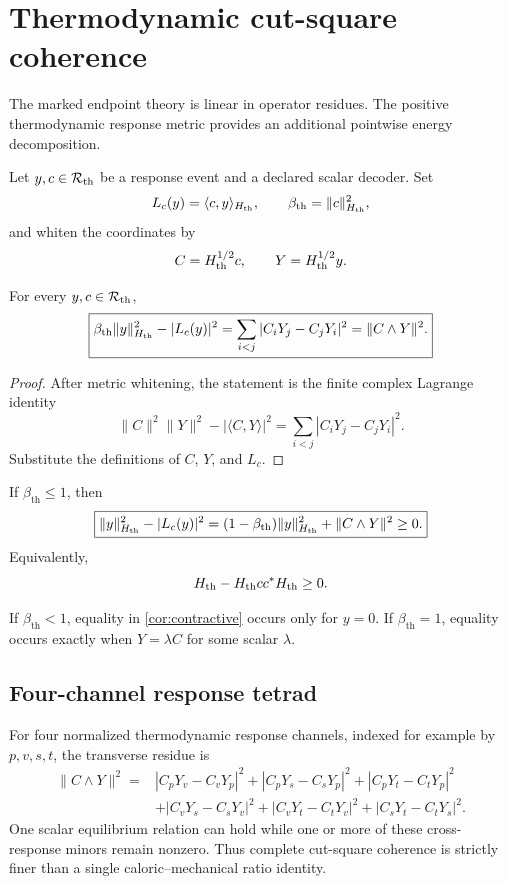 \section{Thermodynamic cut-square coherence}

The marked endpoint theory is linear in operator residues. The positive thermodynamic response metric provides an additional pointwise energy decomposition.

Let $y,c\in\mathcal R_{\mathrm{th}}$ be a response event and a declared scalar decoder. Set
\[
 L_c(y)=\langle c,y\rangle_{H_{\mathrm{th}}},
 \qquad
 \beta_{\mathrm{th}}=\|c\|_{H_{\mathrm{th}}}^2,
\]
and whiten the coordinates by
\[
 C=H_{\mathrm{th}}^{1/2}c,
 \qquad
 Y=H_{\mathrm{th}}^{1/2}y.
\]

\begin{theorem}\label{thm:cut-square}
For every $y,c\in\mathcal R_{\mathrm{th}}$,
\[
 \boxed{
 \beta_{\mathrm{th}}\|y\|_{H_{\mathrm{th}}}^2
 -|L_c(y)|^2
 =\sum_{i<j}|C_iY_j-C_jY_i|^2
 =\|C\wedge Y\|^2.}
\]
\end{theorem}

\begin{proof}
After metric whitening, the statement is the finite complex Lagrange identity
\[
 \|C\|^2\|Y\|^2-|\langle C,Y\rangle|^2
 =\sum_{i<j}|C_iY_j-C_jY_i|^2.
\]
Substitute the definitions of $C$, $Y$, and $L_c$.
\end{proof}

\begin{corollary}\label{cor:contractive}
If $\beta_{\mathrm{th}}\le1$, then
\[
 \boxed{
 \|y\|_{H_{\mathrm{th}}}^2-|L_c(y)|^2
 =(1-\beta_{\mathrm{th}})\|y\|_{H_{\mathrm{th}}}^2
 +\|C\wedge Y\|^2\ge0.}
\]
Equivalently,
\[
 H_{\mathrm{th}}-H_{\mathrm{th}} cc^*H_{\mathrm{th}}\ge0.
\]
\end{corollary}

\begin{corollary}
If $\beta_{\mathrm{th}}<1$, equality in \cref{cor:contractive} occurs only for $y=0$. If $\beta_{\mathrm{th}}=1$, equality occurs exactly when $Y=\lambda C$ for some scalar $\lambda$.
\end{corollary}

\subsection{Four-channel response tetrad}

For four normalized thermodynamic response channels, indexed for example by $p,v,s,t$, the transverse residue is
\[
\begin{aligned}
\|C\wedge Y\|^2={}&
|C_pY_v-C_vY_p|^2
+|C_pY_s-C_sY_p|^2
+|C_pY_t-C_tY_p|^2\\
&+|C_vY_s-C_sY_v|^2
+|C_vY_t-C_tY_v|^2
+|C_sY_t-C_tY_s|^2.
\end{aligned}
\]
One scalar equilibrium relation can hold while one or more of these cross-response minors remain nonzero. Thus complete cut-square coherence is strictly finer than a single caloric--mechanical ratio identity.

